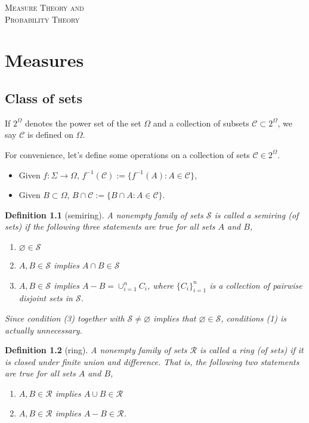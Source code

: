 \documentclass{report}
\newtheorem{definition}{Definition}[section]
\theoremstyle{nonumberplain}
\begin{document}
\begin{center}
	\textsc{\Huge Measure Theory and}
	~\\
	\vspace{1em}  
	\textsc{\Huge Probability Theory}	
\end{center}
\vspace{1em} 
\tableofcontents
\chapter{Measures}
\section{Class of sets}
If $2^\Omega$ denotes the power set of the set $\Omega$ and a collection of subsets $\mathcal{C}\subset2^\Omega$, we say $\mathcal{C}$ is defined on $\Omega$.

For convenience, let's define some operations on a collection of sets $\mathcal{C}\in 2^{\Omega}$.
\begin{itemize}
	\item Given $f:\Sigma\to\Omega$, $f^{-1}(\mathcal{C}):=\{f^{-1}(A):A\in\mathcal{C}\}$,
	\item Given $B\subset \Omega$, $B\cap \mathcal{C}:=\{B\cap A:A\in\mathcal{C}\}$.
\end{itemize}
\begin{definition}[semiring]
	A nonempty family of sets $\mathcal{S}$ is called a \emph{semiring (of sets)} if the following three statements are true for all sets $A$ and $B$,
	\begin{enumerate}[(1)]
		\item $\varnothing\in \mathcal{S}$
		\item $A,B\in \mathcal{S}$ implies $A\cap B\in\mathcal{S}$ 
		\item $A,B\in \mathcal{S}$ implies $A-B=\cup_{i=1}^n C_i$, where $\{C_{i}\}_{i=1}^{n}$ is a collection of pairwise disjoint sets in $\mathcal{S}$.
	\end{enumerate}	
	Since condition (3) together with $\mathcal{S} \neq \varnothing$ implies that $\varnothing \in \mathcal{S}$, conditions (1) is actually unnecessary.
\end{definition}

\begin{definition}[ring]
	A nonempty family of sets $\mathcal{R}$ is called a \emph{ring (of sets)} if it is closed under finite union and difference. That is, the following two statements are true for all sets $A$ and $B$,
	\begin{enumerate}[(1)]
	\item $A,B\in \mathcal{R}$ implies $A\cup B\in\mathcal{R}$ 
	\item $A,B\in \mathcal{R}$ implies $A-B\in\mathcal{R}$.
	\end{enumerate}	
\end{definition}
\end{document}
